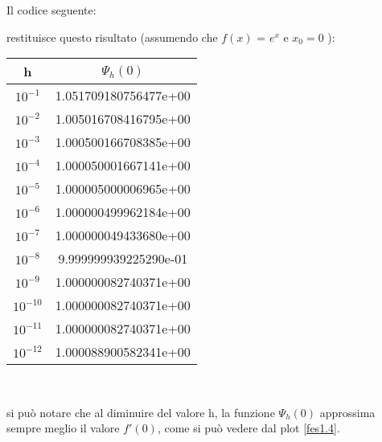 Il codice seguente:

\newpage
restituisce questo risultato (assumendo che $f(x)$ = $ e^x $ e $ x_0 = 0 $ ): 
\begin{center}
\begin{tabular}{c|c}
h & \( \Psi_{h}(0) \)  \\
\hline
    \(10^{-1}\) & 1.051709180756477e+00\\
    \(10^{-2}\) & 1.005016708416795e+00\\
    \(10^{-3}\) & 1.000500166708385e+00\\
    \(10^{-4}\) & 1.000050001667141e+00\\
    \(10^{-5}\) & 1.000005000006965e+00\\
    \(10^{-6}\) & 1.000000499962184e+00\\
    \(10^{-7}\) & 1.000000049433680e+00\\
    \(10^{-8}\) & 9.999999939225290e-01\\
    \(10^{-9}\) & 1.000000082740371e+00\\
    \(10^{-10}\) & 1.000000082740371e+00\\
    \(10^{-11}\) & 1.000000082740371e+00\\
    \(10^{-12}\) & 1.000088900582341e+00\\
\end{tabular} \\
\end{center}
si può notare che al diminuire del valore h, la funzione \(\Psi_{h}(0)\) approssima sempre meglio il valore $f'(0)$, come si può vedere dal plot \ref{fes1.4}.